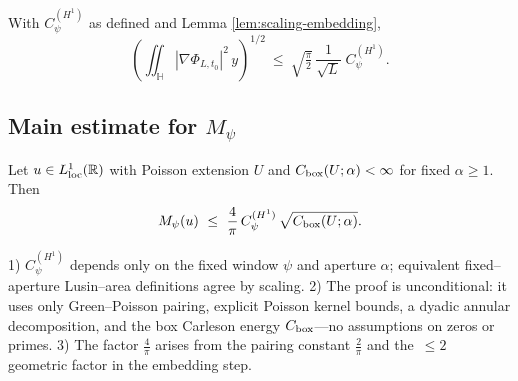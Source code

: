 \begin{lemma}\label{lem:windowH1-embedding}
With $C_\psi^{(H^1)}$ as defined and Lemma \ref{lem:scaling-embedding},
\[
\left(\iint_{\mathbb{H}} |\nabla \Phi_{L,t_0}|^2\,y\right)^{1/2}\ \le\ \sqrt{\tfrac{\pi}{2}}\,\frac{1}{\sqrt{L}}\;C_\psi^{(H^1)}.
\]
\end{lemma}

\subsection*{Main estimate for $M_\psi$}

\begin{theorem}\label{thm:Mpsi-embedding}
Let $u\in L^1_{\rm loc}(\mathbb{R})$ with Poisson extension $U$ and $C_{\rm box}(U;\alpha)<\infty$ for fixed $\alpha\ge1$. Then
\[
M_\psi(u)\ \le\ \frac{4}{\pi}\,C_\psi^{(H^1)}\,\sqrt{C_{\rm box}(U;\alpha)}.
\]
\end{theorem}

\begin{remark}
1) $C_\psi^{(H^1)}$ depends only on the fixed window $\psi$ and aperture $\alpha$; equivalent fixed–aperture Lusin–area definitions agree by scaling.  
2) The proof is unconditional: it uses only Green–Poisson pairing, explicit Poisson kernel bounds, a dyadic annular decomposition, and the box Carleson energy $C_{\rm box}$—no assumptions on zeros or primes.  
3) The factor $\tfrac{4}{\pi}$ arises from the pairing constant $\tfrac{2}{\pi}$ and the $\,\le 2\,$ geometric factor in the embedding step.
\end{remark}
